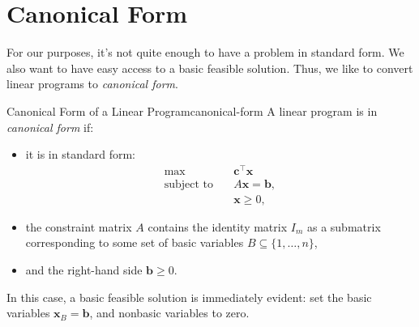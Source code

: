 \section{Canonical Form}
For our purposes, it's not quite enough to have a problem in standard form.  We also want to have easy access to a basic feasible solution.  Thus, we like to convert linear programs to \emph{canonical form}.

\begin{definition}{Canonical Form of a Linear Program}{canonical-form}
A linear program is in \emph{canonical form} if:
\begin{itemize}
    \item it is in standard form:
    \[
    \begin{aligned}
    \max \quad & \mathbf{c}^\top \mathbf{x} \\
    \text{subject to} \quad & A \mathbf{x} = \mathbf{b}, \\
    & \mathbf{x} \geq 0,
    \end{aligned}
    \]
    \item the constraint matrix \( A \) contains the identity matrix \( I_m \) as a submatrix corresponding to some set of basic variables \( B \subseteq \{1, \dots, n\} \),
    \item and the right-hand side \( \mathbf{b} \geq 0 \).
\end{itemize}
In this case, a basic feasible solution is immediately evident: set the basic variables \( \mathbf{x}_B = \mathbf{b} \), and nonbasic variables to zero.
\end{definition}


